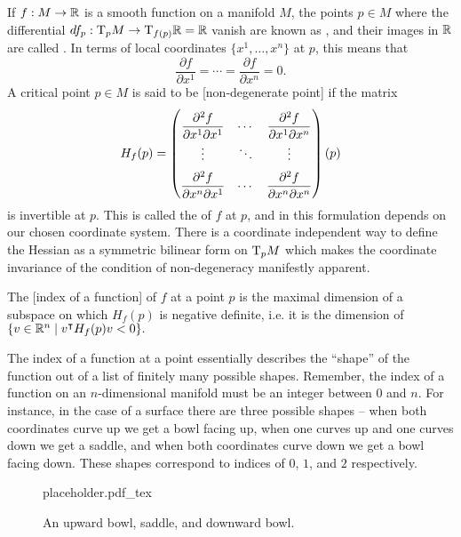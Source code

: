 If $f : M \to \mathbb{R}$ is a smooth function on a manifold $M$, the points $p\in M$ where the differential $df_p : \mathrm{T}_p M \to \mathrm{T}_{f(p)} \mathbb{R} = \mathbb{R}$ vanish are known as , and their images in $\mathbb{R}$ are called . In terms of local coordinates $\{x^1,\ldots, x^n\}$ at $p$, this means that
\begin{equation}
	\frac{\partial f}{\partial x^1}=\cdots=\frac{\partial f}{\partial x^n} = 0.
\end{equation}
A critical point $p\in M$ is said to be [non-degenerate point] if the matrix
\begin{equation}
	\everymath={\displaystyle}
	\renewcommand*{\arraystretch}{2}
	H_f(p) = \begin{pmatrix}
		\frac{\partial^2 f}{\partial x^1\partial x^1} & \cdots &
		\frac{\partial^2 f}{\partial x^1\partial x^n}                   \\
		\vdots                                        & \ddots & \vdots \\
		\frac{\partial^2 f}{\partial x^n\partial x^1} & \cdots &
		\frac{\partial^2 f}{\partial x^n\partial x^n}                   \\
	\end{pmatrix}(p)
\end{equation}
is invertible at $p$. This is called the  of $f$ at $p$, and in this formulation depends on our chosen coordinate system.
There is a coordinate independent way to define the Hessian as a symmetric bilinear form on $\mathrm{T}_p M$ which makes the coordinate invariance of the condition of non-degeneracy manifestly apparent.

\begin{definition}
	The [index of a function] of $f$ at a point $p$ is the maximal dimension of a subspace on which $H_f(p)$ is negative definite, i.e. it is the dimension of $\{v\in \mathbb{R}^n \mid v^\intercal H_f(p) v < 0\}.$
\end{definition}

The index of a function at a point essentially describes the ``shape'' of the function out of a list of finitely many possible shapes. Remember, the index of a function on an $n$-dimensional manifold must be an integer between $0$ and $n$. For instance, in the case of a surface there are three possible shapes -- when both coordinates curve up we get a bowl facing up, when one curves up and one curves down we get a saddle, and when both coordinates curve down we get a bowl facing down. These shapes correspond to indices of $0$, $1$, and $2$ respectively.
\begin{figure}[ht]
	\centering
	{placeholder.pdf_tex}
	\caption{An upward bowl, saddle, and downward bowl.}
\end{figure}

